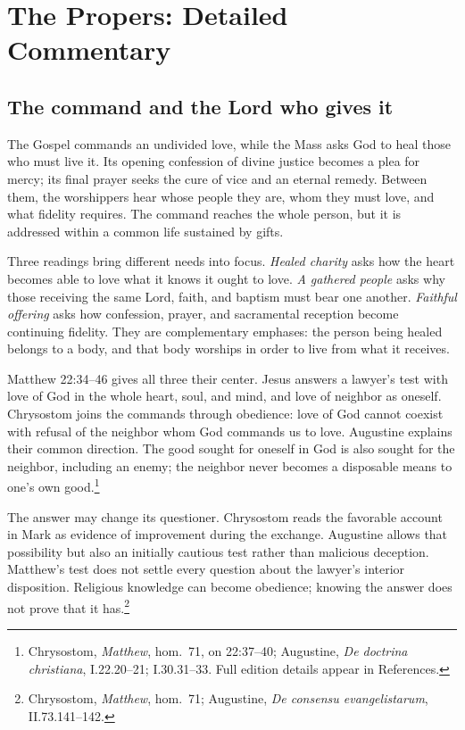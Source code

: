 \section{The Propers: Detailed Commentary}

\subsection{The command and the Lord who gives it}

The Gospel commands an undivided love, while the Mass asks God to heal those who must live it. Its opening confession of divine justice becomes a plea for mercy; its final prayer seeks the cure of vice and an eternal remedy. Between them, the worshippers hear whose people they are, whom they must love, and what fidelity requires. The command reaches the whole person, but it is addressed within a common life sustained by gifts.

Three readings bring different needs into focus. \emph{Healed charity} asks how the heart becomes able to love what it knows it ought to love. \emph{A gathered people} asks why those receiving the same Lord, faith, and baptism must bear one another. \emph{Faithful offering} asks how confession, prayer, and sacramental reception become continuing fidelity. They are complementary emphases: the person being healed belongs to a body, and that body worships in order to live from what it receives.

Matthew 22:34--46 gives all three their center. Jesus answers a lawyer's test with love of God in the whole heart, soul, and mind, and love of neighbor as oneself. Chrysostom joins the commands through obedience: love of God cannot coexist with refusal of the neighbor whom God commands us to love. Augustine explains their common direction. The good sought for oneself in God is also sought for the neighbor, including an enemy; the neighbor never becomes a disposable means to one's own good.\footnote{Chrysostom, \textit{Matthew}, hom.~71, on 22:37--40; Augustine, \textit{De doctrina christiana}, I.22.20--21; I.30.31--33. Full edition details appear in References.}

The answer may change its questioner. Chrysostom reads the favorable account in Mark as evidence of improvement during the exchange. Augustine allows that possibility but also an initially cautious test rather than malicious deception. Matthew's test does not settle every question about the lawyer's interior disposition. Religious knowledge can become obedience; knowing the answer does not prove that it has.\footnote{Chrysostom, \textit{Matthew}, hom.~71; Augustine, \textit{De consensu evangelistarum}, II.73.141--142.}

